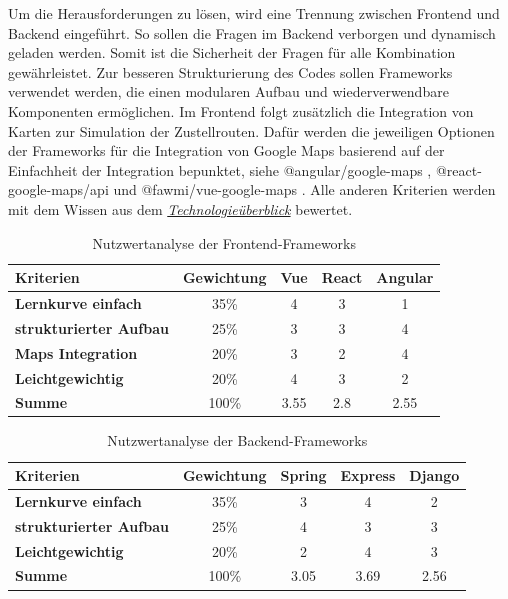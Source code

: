 \documentclass[biblatex]{lni}
\begin{document}
Um die Herausforderungen zu lösen, wird eine Trennung zwischen Frontend und Backend eingeführt.
So sollen die Fragen im Backend verborgen und dynamisch geladen werden.
Somit ist die Sicherheit der Fragen für alle Kombination gewährleistet.
Zur besseren Strukturierung des Codes sollen Frameworks verwendet werden, die einen modularen Aufbau und wiederverwendbare Komponenten ermöglichen.
Im Frontend folgt zusätzlich die Integration von Karten zur Simulation der Zustellrouten.
Dafür werden die jeweiligen Optionen der Frameworks für die Integration von Google Maps basierend auf der Einfachheit der Integration bepunktet,
siehe @angular/google-maps \cite{ngMaps}, @react-google-maps/api \cite{rctMaps} und @fawmi/vue-google-maps \cite{vueMaps}.
Alle anderen Kriterien werden mit dem Wissen aus dem \hyperref[sec:tec-überblick]{\textit{Technologieüberblick}} bewertet.

\begin{table}[h!]
  \centering
  \caption{Nutzwertanalyse der Frontend-Frameworks}
  \label{tab:nutz-frontend}
  \begin{tabular}{@{}lcccc@{}}
    \toprule
    \textbf{Kriterien} & \textbf{Gewichtung} & \textbf{Vue} & \textbf{React} & \textbf{Angular} \\ \midrule
    \textbf{Lernkurve einfach} & 35\% & 4 & 3 & 1 \\ \midrule
    \textbf{strukturierter Aufbau} & 25\% & 3 & 3 & 4 \\ \midrule
    \textbf{Maps Integration} & 20\% & 3 & 2 & 4 \\ \midrule
    \textbf{Leichtgewichtig} & 20\% & 4 & 3 & 2 \\ \midrule
    \textbf{Summe} & 100\% & 3.55 & 2.8 & 2.55 \\ \bottomrule
  \end{tabular}
\end{table}

\begin{table}[h!]
  \centering
  \caption{Nutzwertanalyse der Backend-Frameworks}
  \label{tab:nutz-backend}
  \begin{tabular}{@{}lcccc@{}}
    \toprule
    \textbf{Kriterien} & \textbf{Gewichtung} & \textbf{Spring} & \textbf{Express} & \textbf{Django} \\ \midrule
    \textbf{Lernkurve einfach} & 35\% & 3 & 4 & 2 \\ \midrule
    \textbf{strukturierter Aufbau} & 25\% & 4 & 3 & 3 \\ \midrule
    \textbf{Leichtgewichtig} & 20\% & 2 & 4 & 3 \\ \midrule
    \textbf{Summe} & 100\% & 3.05 & 3.69 & 2.56 \\ \bottomrule
  \end{tabular}
\end{table}
\end{document}

